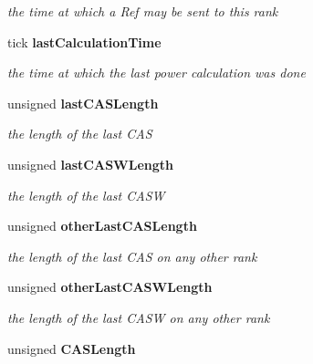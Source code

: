 \begin{CompactItemize}
\begin{CompactList}\small\item\em the time at which a Ref may be sent to this rank \item\end{CompactList}\item 
tick {\bf lastCalculationTime}\label{class_d_r_a_msim_i_i_1_1_rank_6f7af9163075b15ab345b29a0be875ce}

\begin{CompactList}\small\item\em the time at which the last power calculation was done \item\end{CompactList}\item 
unsigned {\bf lastCASLength}\label{class_d_r_a_msim_i_i_1_1_rank_1e62f84cb1dfb615c3609112b5bb4222}

\begin{CompactList}\small\item\em the length of the last CAS \item\end{CompactList}\item 
unsigned {\bf lastCASWLength}\label{class_d_r_a_msim_i_i_1_1_rank_11af9792fcf7e48ec2df25c807e4708f}

\begin{CompactList}\small\item\em the length of the last CASW \item\end{CompactList}\item 
unsigned {\bf otherLastCASLength}\label{class_d_r_a_msim_i_i_1_1_rank_581c24fba006c13b3acf0ed056cf1914}

\begin{CompactList}\small\item\em the length of the last CAS on any other rank \item\end{CompactList}\item 
unsigned {\bf otherLastCASWLength}\label{class_d_r_a_msim_i_i_1_1_rank_126e34b8d0835a4fe61c2236fa2a3f2c}

\begin{CompactList}\small\item\em the length of the last CASW on any other rank \item\end{CompactList}\item 
unsigned {\bf CASLength}\label{class_d_r_a_msim_i_i_1_1_rank_884e8a2f3771a545733a308dde5dd13f}


\end{CompactItemize}
